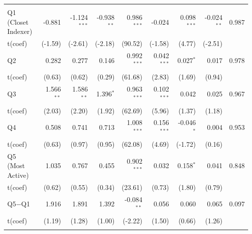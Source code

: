 \begin{table}[!htbp]
{\begin{tabular*}{\linewidth}{@{\extracolsep{\fill}}lrrrrrrrr}
\addlinespace[0.3em]
\hline
\multicolumn{9}{l}{Panel B: Active --- VW Gross}\\
\hspace{1em}Q1 (Closet Indexer) & -0.881 & -1.124$^{***}$ & -0.938$^{**}$ & 0.986$^{***}$ & -0.024 & 0.098$^{***}$ & -0.024$^{**}$ & 0.987\\
\hspace{1em}t(coef) & (-1.59) & (-2.61) & (-2.18) & (90.52) & (-1.58) & (4.77) & (-2.51) & \\
\hspace{1em}Q2 & 0.282 & 0.277 & 0.146 & 0.992$^{***}$ & 0.042$^{***}$ & 0.027$^{*}$ & 0.017 & 0.978\\
\hspace{1em}t(coef) & (0.63) & (0.62) & (0.29) & (61.68) & (2.83) & (1.69) & (0.94) & \\
\hspace{1em}Q3 & 1.566$^{**}$ & 1.586$^{**}$ & 1.396$^{*}$ & 0.963$^{***}$ & 0.102$^{***}$ & 0.042 & 0.025 & 0.967\\
\hspace{1em}t(coef) & (2.03) & (2.20) & (1.92) & (62.69) & (5.96) & (1.37) & (1.18) & \\
\hspace{1em}Q4 & 0.508 & 0.741 & 0.713 & 1.008$^{***}$ & 0.156$^{***}$ & -0.046$^{*}$ & 0.004 & 0.953\\
\hspace{1em}t(coef) & (0.63) & (0.97) & (0.95) & (62.08) & (4.69) & (-1.72) & (0.16) & \\
\hspace{1em}Q5 (Most Active) & 1.035 & 0.767 & 0.455 & 0.902$^{***}$ & 0.032 & 0.158$^{*}$ & 0.041 & 0.848\\
\hspace{1em}t(coef) & (0.62) & (0.55) & (0.34) & (23.61) & (0.73) & (1.80) & (0.79) & \\
\hspace{1em}Q5$-$Q1 & 1.916 & 1.891 & 1.392 & -0.084$^{**}$ & 0.056 & 0.060 & 0.065 & 0.097\\
\hspace{1em}t(coef) & (1.19) & (1.28) & (1.00) & (-2.22) & (1.50) & (0.66) & (1.26) & \\
\addlinespace[0.3em]
\hline
\bottomrule
\end{tabular*}%
}\sbefit
\fi
\setlength{\tabletempwidth}{\wd\tabletempbox}
\ifdim\tabletempwidth>\linewidth\setlength{\tabletempwidth}{\linewidth}\fi
\begin{minipage}{\tabletempwidth}
\captionsetup{width=\linewidth}

\end{minipage}
\end{table}
